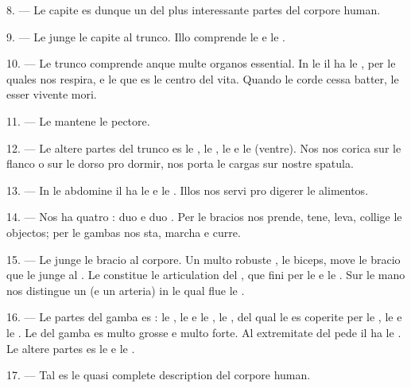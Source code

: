 8. --- Le capite es dunque un del plus interessante partes del corpore human.

\VUsaut{4.4mm}
\VUsaut{3.0mm}

9. --- Le  junge le capite al trunco. Illo comprende le
 e le .

10. --- Le trunco comprende anque multe organos essential. In le 
il ha le , per le quales nos respira, e le  que
es le centro del vita. Quando le corde cessa batter, le esser vivente mori.

11. --- Le  mantene le pectore.

12. --- Le altere partes del trunco es le , le , le
 e le  (ventre). Nos nos corica sur le flanco
o sur le dorso pro dormir, nos porta le cargas sur nostre spatula.

13. --- In le abdomine il ha le  e le .
Illos nos servi pro digerer le alimentos.

\VUsaut{4.4mm}
\VUsaut{3.0mm}

14. --- Nos ha quatro  : duo  e duo
. Per le bracios nos prende, tene, leva, collige le objectos; per
le gambas nos sta, marcha e curre.

15. --- Le  junge le bracio al corpore. Un multo robuste
, le biceps, move le bracio que le  junge al
. Le  constitue le articulation del
, que fini per le  e le . Sur le
mano nos distingue un  (e un arteria) in le qual flue le
.

16. --- Le partes del gamba es : le , le  e le
, le , del qual le  es coperite per
le , le  e le . Le 
del gamba es multo grosse e multo forte. Al extremitate del pede il ha le
. Le altere partes es le  e le
.

17. --- Tal es le quasi complete description del corpore human.

